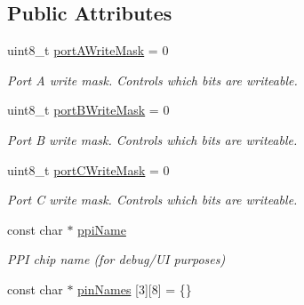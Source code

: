 \subsection*{Public Attributes}
\begin{DoxyCompactItemize}
\item 
\hypertarget{classIntel8255_a2b5cdceaa86b03a1d19c5c3f749f6d38}{uint8\-\_\-t \hyperlink{classIntel8255_a2b5cdceaa86b03a1d19c5c3f749f6d38}{port\-A\-Write\-Mask} = 0}\label{classIntel8255_a2b5cdceaa86b03a1d19c5c3f749f6d38}

\begin{DoxyCompactList}\small\item\em Port A write mask. Controls which bits are writeable. \end{DoxyCompactList}\item 
\hypertarget{classIntel8255_a0cba5817d6d2b0017b8e71d1d5fca1d8}{uint8\-\_\-t \hyperlink{classIntel8255_a0cba5817d6d2b0017b8e71d1d5fca1d8}{port\-B\-Write\-Mask} = 0}\label{classIntel8255_a0cba5817d6d2b0017b8e71d1d5fca1d8}

\begin{DoxyCompactList}\small\item\em Port B write mask. Controls which bits are writeable. \end{DoxyCompactList}\item 
\hypertarget{classIntel8255_aea9eef42c705822317af5fb69b6f5c35}{uint8\-\_\-t \hyperlink{classIntel8255_aea9eef42c705822317af5fb69b6f5c35}{port\-C\-Write\-Mask} = 0}\label{classIntel8255_aea9eef42c705822317af5fb69b6f5c35}

\begin{DoxyCompactList}\small\item\em Port C write mask. Controls which bits are writeable. \end{DoxyCompactList}\item 
\hypertarget{classIntel8255_a4eb95c6f23bf4192324853afe9fe2178}{const char $\ast$ \hyperlink{classIntel8255_a4eb95c6f23bf4192324853afe9fe2178}{ppi\-Name}}\label{classIntel8255_a4eb95c6f23bf4192324853afe9fe2178}

\begin{DoxyCompactList}\small\item\em P\-P\-I chip name (for debug/\-U\-I purposes) \end{DoxyCompactList}\item 
\hypertarget{classIntel8255_a9b4ea7714e1b9df34052e269e7f06dfa}{const char $\ast$ \hyperlink{classIntel8255_a9b4ea7714e1b9df34052e269e7f06dfa}{pin\-Names} \mbox{[}3\mbox{]}\mbox{[}8\mbox{]} = \{\}}\label{classIntel8255_a9b4ea7714e1b9df34052e269e7f06dfa}


\end{DoxyCompactItemize}
